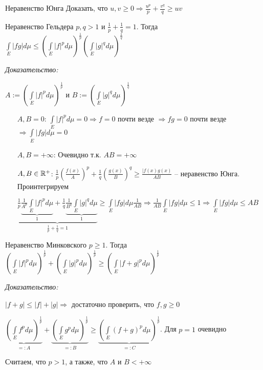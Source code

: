 \documentclass[12pt]{article}
\begin{document}
\begin{Exercise}{Неравенство Юнга}
    Доказать, что $u, v \geq 0 \Rightarrow \frac{u^p}{p} + \frac{v^q}{q} \geq uv$
\end{Exercise}

\begin{theo}{Неравенство Гельдера}
    $p, q > 1$ и $\frac{1}{p} + \frac{1}{q} = 1$. Тогда $\int\limits_E |fg|d\mu \leq (\int\limits_E |f|^pd\mu)^{\frac{1}{p}}(\int\limits_E |g|^qd\mu)^{\frac{1}{q}}$
\end{theo}

\textit{Доказательство:}

$A := (\int\limits_E |f|^pd\mu)^{\frac{1}{p}}$ и $B := (\int\limits_E |g|^qd\mu)^{\frac{1}{q}}$

\begin{itemize}
    \item[$A, B = 0$: ] $\int\limits_E |f|^pd\mu = 0 \Rightarrow f = 0$ почти везде $\Rightarrow fg = 0$ почти везде $\Rightarrow \int\limits_E |fg|d\mu = 0$
    \item[$A, B = + \infty$: ] Очевидно т.к. $AB = + \infty$
    \item[$A, B \in \mathbb R^+$: ] $\frac{1}{p}(\frac{f(x)}{A})^p + \frac{1}{q}(\frac{g(x)}{B})^q \geq \frac{|f(x)g(x)}{AB}$ -- неравенство Юнга. Проинтегрируем
    
    $\underbrace{\frac{1}{p} \underbrace{\frac{1}{A^p} \int\limits_E |f|^pd\mu}_1 + \frac{1}{q}\underbrace{\frac{1}{B^q}\int\limits_E |g|^qd\mu}_1}_{\frac{1}{p} + \frac{1}{q} = 1} \geq \int\limits_E |fg|d\mu \frac{1}{AB} \Rightarrow \frac{1}{AB} \int\limits_E |fg|d\mu \leq 1 \Rightarrow \int\limits_E |fg|d\mu \leq AB$
\end{itemize}

\begin{theo}{Неравенство Минковского}
    $p \geq 1$. Тогда $(\int\limits_E |f|^pd\mu)^\frac{1}{p} + (\int\limits_E |g|^pd\mu)^\frac{1}{p} \geq (\int\limits_E |f + g|^pd\mu)^\frac{1}{p}$
\end{theo}

\textit{Доказательство:}

$|f + g| \leq |f| + |g| \Rightarrow$ достаточно проверить, что $f, g \geq 0$

$\underbrace{(\int\limits_E f^pd\mu)^\frac{1}{p}}_{=: A} + \underbrace{(\int\limits_E g^pd\mu)^\frac{1}{p}}_{=: B} \geq \underbrace{(\int\limits_E (f + g)^pd\mu)^\frac{1}{p}}_{=: C}$. Для $p = 1$ очевидно 

Считаем, что $p > 1$, а также, что $A$ и $B < + \infty$
\end{document}
